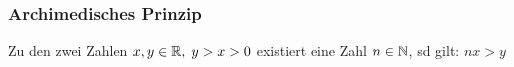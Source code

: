 \subsubsection{Archimedisches Prinzip}
\begin{satz}
Zu den zwei Zahlen $x, y \in \mathbb{R}, \; y > x > 0$ existiert eine Zahl $n \in \mathbb{N}$, sd gilt: $nx > y$
\end{satz}
\pagebreak
